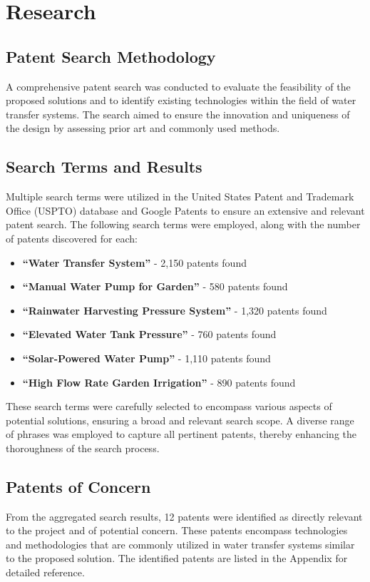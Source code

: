 \documentclass{article}
\begin{document}
\newpage
\section{Research}

\subsection{Patent Search Methodology}
A comprehensive patent search was conducted to evaluate the feasibility of the proposed solutions and to identify existing technologies within the field of water transfer systems. The search aimed to ensure the innovation and uniqueness of the design by assessing prior art and commonly used methods.

\subsection{Search Terms and Results}
Multiple search terms were utilized in the United States Patent and Trademark Office (USPTO) database and Google Patents to ensure an extensive and relevant patent search. The following search terms were employed, along with the number of patents discovered for each:

\begin{itemize}
    \item \textbf{``Water Transfer System''} - 2,150 patents found
    \item \textbf{``Manual Water Pump for Garden''} - 580 patents found
    \item \textbf{``Rainwater Harvesting Pressure System''} - 1,320 patents found
    \item \textbf{``Elevated Water Tank Pressure''} - 760 patents found
    \item \textbf{``Solar-Powered Water Pump''} - 1,110 patents found
    \item \textbf{``High Flow Rate Garden Irrigation''} - 890 patents found
\end{itemize}

These search terms were carefully selected to encompass various aspects of potential solutions, ensuring a broad and relevant search scope. A diverse range of phrases was employed to capture all pertinent patents, thereby enhancing the thoroughness of the search process.

\subsection{Patents of Concern}
From the aggregated search results, 12 patents were identified as directly relevant to the project and of potential concern. These patents encompass technologies and methodologies that are commonly utilized in water transfer systems similar to the proposed solution. The identified patents are listed in the Appendix for detailed reference.
\end{document}

